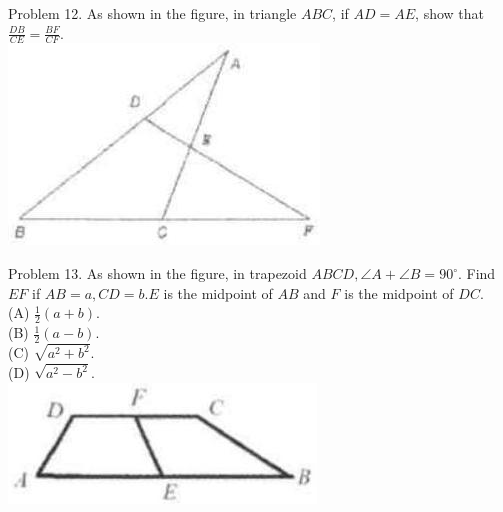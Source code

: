 \documentclass[10pt]{article}
\begin{document}
Problem 12. As shown in the figure, in triangle \(A B C\), if \(A D=A E\), show that \(\frac{D B}{C E}=\frac{B F}{C F}\).\\
\includegraphics[max width=\textwidth, center]{2025_04_17_97bc1f7e44d93c271a88g-128(1)}

Problem 13. As shown in the figure, in trapezoid \(A B C D, \angle A+\angle B=90^{\circ}\). Find \(E F\) if \(A B=a, C D=b . E\) is the midpoint of \(A B\) and \(F\) is the midpoint of \(D C\).\\
(A) \(\frac{1}{2}(a+b)\).\\
(B) \(\frac{1}{2}(a-b)\).\\
(C) \(\sqrt{a^{2}+b^{2}}\).\\
(D) \(\sqrt{a^{2}-b^{2}}\).\\
\includegraphics[max width=\textwidth, center]{2025_04_17_97bc1f7e44d93c271a88g-128(4)}
\end{document}
